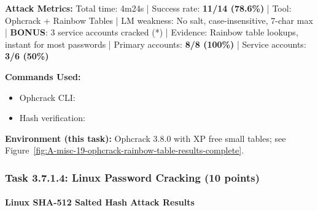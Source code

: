 \noindent\textbf{Attack Metrics:} Total time: 4m24s | Success rate: \textbf{11/14 (78.6\%)} | Tool: Ophcrack + Rainbow Tables | LM weakness: No salt, case-insensitive, 7-char max | \textbf{BONUS}: 3 service accounts cracked (*) | Evidence: Rainbow table lookups, instant for most passwords | Primary accounts: \textbf{8/8 (100\%)} | Service accounts: \textbf{3/6 (50\%)}

\noindent\textbf{Commands Used:}
\begin{itemize}[nosep]
  \item Ophcrack CLI: 
  \item Hash verification: 
\end{itemize}

\noindent\textbf{Environment (this task):} Ophcrack 3.8.0 with XP free small tables; see Figure~\ref{fig:A-misc-19-ophcrack-rainbow-table-results-complete}.



\subsubsection{Task 3.7.1.4: Linux Password Cracking (10 points)}


\paragraph{Linux SHA-512 Salted Hash Attack Results}

